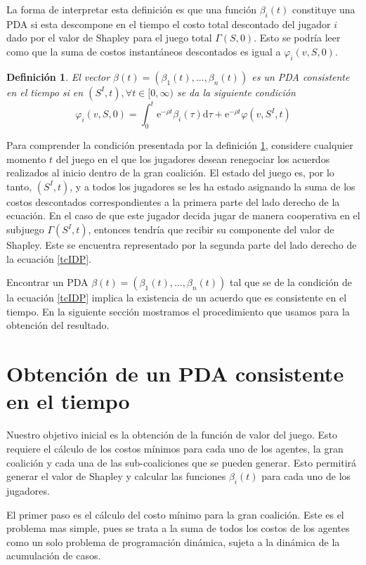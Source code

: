 \documentclass[11pt, oneside]{article}
\newtheorem{definition}{Definición}
\newcommand{\eu}{\ensuremath{\mathrm{e}}}
\newcommand{\du}{\ensuremath{\mathrm{d}}}
\begin{document}
La forma de interpretar esta definición es que una función $\beta_i(t)$ constituye una PDA si esta descompone en el tiempo el costo total descontado del jugador $i$ dado por el valor de Shapley para el juego total $\Gamma(S,0)$. Esto se podría leer como que la suma de costos instantáneos descontados es igual a $\varphi_i(v,S,0)$.

\begin{definition}\label{tcIDP}
El vector $\beta(t) = (\beta_1(t),\dots, \beta_n(t))$ es un PDA consistente en el tiempo si en $(S^I, t), \forall t \in [0,\infty)$ se da la siguiente condición
\begin{equation}
	\varphi_i(v,S,0) = \int_0^t \eu^{-\rho t} \beta_i(\tau) \du \tau+ \eu^{-\rho t} \varphi(v, S^I, t)
\end{equation}
\end{definition}

Para comprender la condición presentada por la definición \ref{tcIDP}, considere cualquier momento $t$ del juego en el que los jugadores desean renegociar los acuerdos realizados al inicio dentro de la gran coalición. El estado del juego es, por lo tanto, $(S^I,t)$, y a todos los jugadores se les ha estado asignando la suma de los costos descontados correspondientes a la primera parte del lado derecho de la ecuación. En el caso de que este jugador decida jugar de manera cooperativa en el subjuego $\Gamma(S^I, t)$, entonces tendría que recibir su componente del valor de Shapley. Este se encuentra representado por la segunda parte del lado derecho de la ecuación \eqref{tcIDP}.

Encontrar un PDA $\beta(t) = (\beta_1(t), \dots, \beta_n(t))$ tal que se de la condición de la ecuación \eqref{tcIDP} implica la existencia de un acuerdo que es consistente en el tiempo. En la siguiente sección mostramos el procedimiento que usamos para la obtención del resultado.

\section{Obtención de un PDA consistente en el tiempo}
Nuestro objetivo inicial es la obtención de la función de valor del juego. Esto requiere el cálculo de los costos mínimos para cada uno de los agentes, la gran coalición y cada una de las sub-coaliciones que se pueden generar. Esto permitirá generar el valor de Shapley y calcular las funciones $\beta_i(t)$ para cada uno de los jugadores.

El primer paso es el cálculo del costo mínimo para la gran coalición. Este es el problema mas simple, pues se trata a la suma de todos los costos de los agentes como un solo problema de programación dinámica, sujeta a la dinámica de la acumulación de casos.
\end{document}
